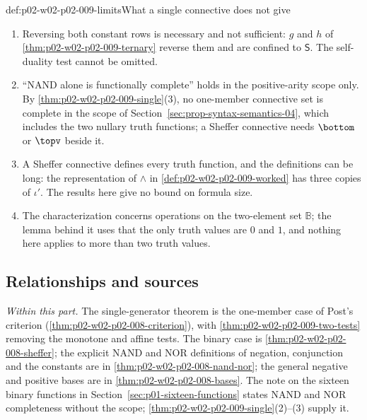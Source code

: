 \begin{hbwarning}{def:p02-w02-p02-009-limits}{What a single connective does not give}
\begin{enumerate}
\item Reversing both constant rows is necessary and not sufficient: \(g\)
  and \(h\) of \cref{thm:p02-w02-p02-009-ternary} reverse them and are
  confined to \(\mathsf S\).  The self-duality test cannot be omitted.
\item ``NAND alone is functionally complete'' holds in the positive-arity
  scope only.  By \cref{thm:p02-w02-p02-009-single}(3), no one-member
  connective set is complete in the scope of
  Section~\ref{sec:prop-syntax-semantics-04}, which includes the two
  nullary truth functions; a Sheffer connective needs \(\bottom\) or
  \(\topv\) beside it.
\item A Sheffer connective defines every truth function, and the
  definitions can be long: the representation of \(\land\) in
  \cref{def:p02-w02-p02-009-worked} has three copies of \(\iota'\).  The
  results here give no bound on formula size.
\item The characterization concerns operations on the two-element set
  \(\mathbb B\); the lemma behind it uses that the only truth values are
  \(0\) and \(1\), and nothing here applies to more than two truth values.
\end{enumerate}
\end{hbwarning}

\subsection{Relationships and sources}
\label{sec:p02-w02-p02-009-relationships}

\emph{Within this part.}  The single-generator theorem is the one-member case
of Post's criterion (\cref{thm:p02-w02-p02-008-criterion}), with
\cref{thm:p02-w02-p02-009-two-tests} removing the monotone and affine tests.
The binary case is \cref{thm:p02-w02-p02-008-sheffer}; the explicit NAND and
NOR definitions of negation, conjunction and the constants are in
\cref{thm:p02-w02-p02-008-nand-nor}; the general negative and positive bases
are in \cref{thm:p02-w02-p02-008-bases}.  The note on the sixteen binary
functions in Section~\ref{sec:p01-sixteen-functions} states NAND and NOR
completeness without the scope; \cref{thm:p02-w02-p02-009-single}(2)--(3)
supply it.

